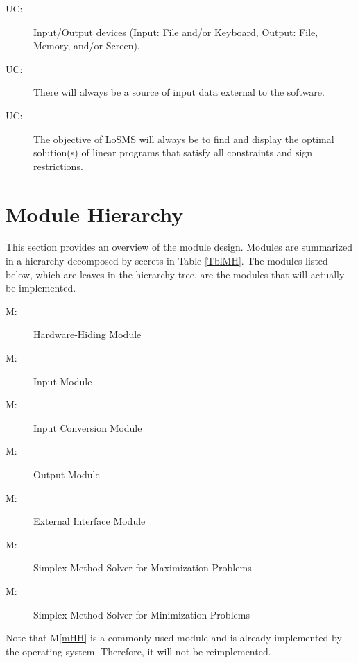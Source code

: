 \documentclass[12pt, titlepage]{article}
\newcounter{ucnum}
\newcommand{\uctheucnum}{UC\theucnum}
\newcounter{mnum}
\newcommand{\mthemnum}{M\themnum}
\newcommand{\mref}[1]{M\ref{#1}}
\newcommand{\famname}{LoSMS} %
\begin{document}
\begin{description}
\item[ \uctheucnum \label{ucIO}:] Input/Output devices
  (Input: File and/or Keyboard, Output: File, Memory, and/or Screen).
  
\item[ \uctheucnum \label{ucInput}:] There will always be
  a source of input data external to the software. 

\item[ \uctheucnum \label{ucObjective}:] The objective of 
\famname{} will always be to find and display the optimal solution(s) of linear 
programs that satisfy all constraints and sign restrictions.
\end{description}

\section{Module Hierarchy} \label{SecMH}

This section provides an overview of the module design. Modules are summarized
in a hierarchy decomposed by secrets in Table \ref{TblMH}. The modules listed
below, which are leaves in the hierarchy tree, are the modules that will
actually be implemented.

\begin{description}
\item [ \mthemnum \label{mHH}:] Hardware-Hiding Module
\item [ \mthemnum \label{mIF}:] Input Module
\item [ \mthemnum \label{mIC}:] Input Conversion Module
\item [ \mthemnum \label{mOF}:] Output Module
\item [ \mthemnum \label{mEI}:] External Interface Module
\item [ \mthemnum \label{mSMax}:] Simplex Method Solver 
for Maximization Problems
\item [ \mthemnum \label{mSMin}:] Simplex Method Solver 
for Minimization Problems
\end{description}

Note that \mref{mHH} is a commonly used module and is already implemented by 
the operating system. Therefore, it will not be reimplemented.
\end{document}
